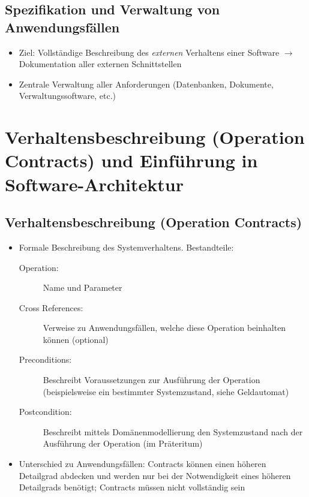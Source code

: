 \subsection{Spezifikation und Verwaltung von Anwendungsfällen}
\begin{itemize}
	\item Ziel: Vollständige Beschreibung des \textit{externen} Verhaltens einer Software \(\rightarrow\) Dokumentation aller externen Schnittstellen
	\item Zentrale Verwaltung aller Anforderungen (Datenbanken, Dokumente, Verwaltungssoftware, etc.)
\end{itemize}



\section{Verhaltensbeschreibung (Operation Contracts) und Einführung in Software-Architektur}

\subsection{Verhaltensbeschreibung (Operation Contracts)}
\begin{itemize}
	\item Formale Beschreibung des Systemverhaltens. Bestandteile:
	\begin{description}
		\item[Operation:] Name und Parameter
		\item[Cross References:] Verweise zu Anwendungsfällen, welche diese Operation beinhalten können (optional)
		\item[Preconditions:] Beschreibt Voraussetzungen zur Ausführung der Operation (beispielsweise ein bestimmter Systemzustand, siehe Geldautomat)
		\item[Postcondition:] Beschreibt mittels Domänenmodellierung den Systemzustand nach der Ausführung der Operation (im Präteritum)
	\end{description}
	\item Unterschied zu Anwendungsfällen: Contracts können einen höheren Detailgrad abdecken und werden nur bei der Notwendigkeit eines höheren Detailgrads benötigt; Contracts müssen nicht vollständig sein
\end{itemize}


